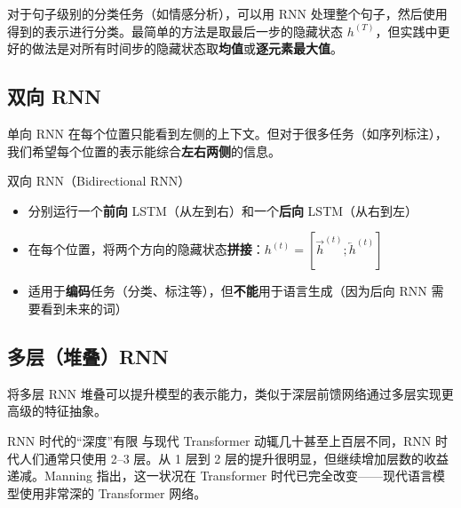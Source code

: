 \documentclass[a4paper]{article}
\begin{document}



对于句子级别的分类任务（如情感分析），可以用 RNN 处理整个句子，然后使用得到的表示进行分类。最简单的方法是取最后一步的隐藏状态 $h^{(T)}$，但实践中更好的做法是对所有时间步的隐藏状态取\textbf{均值}或\textbf{逐元素最大值}。

\subsection{双向 RNN}

单向 RNN 在每个位置只能看到左侧的上下文。但对于很多任务（如序列标注），我们希望每个位置的表示能综合\textbf{左右两侧}的信息。









\begin{importantbox}{双向 RNN（Bidirectional RNN）}
\begin{itemize}
    \item 分别运行一个\textbf{前向} LSTM（从左到右）和一个\textbf{后向} LSTM（从右到左）
    \item 在每个位置，将两个方向的隐藏状态\textbf{拼接}：$h^{(t)} = [\overrightarrow{h}^{(t)}; \overleftarrow{h}^{(t)}]$
    \item 适用于\textbf{编码}任务（分类、标注等），但\textbf{不能}用于语言生成（因为后向 RNN 需要看到未来的词）
\end{itemize}
\end{importantbox}

\subsection{多层（堆叠）RNN}





将多层 RNN 堆叠可以提升模型的表示能力，类似于深层前馈网络通过多层实现更高级的特征抽象。

\begin{warningbox}{RNN 时代的``深度''有限}
与现代 Transformer 动辄几十甚至上百层不同，RNN 时代人们通常只使用 2--3 层。从 1 层到 2 层的提升很明显，但继续增加层数的收益递减。Manning 指出，这一状况在 Transformer 时代已完全改变——现代语言模型使用非常深的 Transformer 网络。
\end{warningbox}
\end{document}
